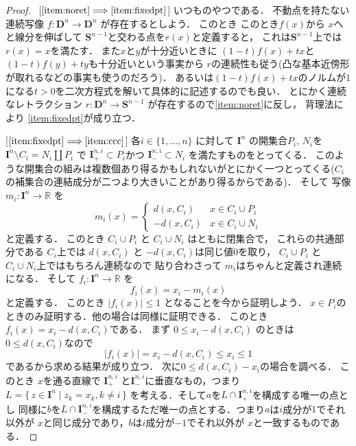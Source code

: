 \documentclass[leqno, a4paper, 12pt]{jsarticle}
\newcommand{\To}{\Longrightarrow}
\newcommand{\rr}{\mathbb{R}}
\newcommand{\mydisc}[1]{\mathbf{D}^{#1}}
\newcommand{\mysphere}[1]{\mathbf{S}^{#1}}
\newcommand{\mycube}[1]{\mathbf{I}^{n}}
\newcommand{\mycubesidep}[2]{\mathbf{I}^{#1, #2}_{+}}
\newcommand{\mycubesidem}[2]{\mathbf{I}^{#1, #2}_{-}}
\begin{document}
\begin{proof}\ 
[$\ref{item:noret}\To \ref{item:fixedpt}$]
いつものやつである．
不動点を持たない連続写像
$f\colon \mydisc{n}\to \mydisc{n}$
が存在するとしよう．
このとき
このとき$f(x)$から
$x$へと線分を伸ばして
$\mysphere{n-1}$と交わる点を$r(x)$と定義すると，
これは$\mysphere{n-1}$上では$r(x)=x$を満たす．
また$x$と$y$が十分近いときに
$(1-t)f(x)+tx$と$(1-t)f(y)+ty$も十分近いという事実から
$r$の連続性も従う(凸な基本近傍形が取れるなどの事実も使うのだろう)．
あるいは$(1-t)f(x)+tx$のノルムが$1$になる$t>0$を二次方程式を解いて具体的に記述するのでも良い．
とにかく連続なレトラクション
$r\colon \mydisc{n}\to \mysphere{n-1}$
が存在するので\ref{item:noret}に反し，
背理法により
\ref{item:fixedpt}が成り立つ．

[$\ref{item:fixedpt}\To \ref{item:ccc}$]
各$i\in \{1, \dots, n\}$
に対して
$\mycube{n}$
の開集合$P_{i}$, 
$N_{i}$を
$\mycube{n}\setminus C_{i}=N_{i}\coprod P_{i}$
で
$\mycubesidep{n}{i}\subset P_{i}$かつ
$\mycubesidem{n}{i}\subset N_{i}$
を満たすものをとってくる．
このような開集合の組みは複数個あり得るかもしれないがとにかく一つとってくる($C_{i}$の補集合の連結成分が二つより大きいことがあり得るからである)．
そして
写像$m_{i}\colon \mycube{n}\to \rr$
を
\[
m_{i}(x)=
\begin{cases}
d(x, C_{i}) & \text{$x \in C_{i}\cup P_{i}$}\\
-d(x, C_{i}) & \text{$x\in C_{i} \cup N_{i}$}
\end{cases}
\]
と定義する．
このとき
$C_{i}\cup P_{i}$
と
$ C_{i}\cup N_{i}$
はともに閉集合で，
これらの共通部分である
$C_{i}$上では
$d(x, C_{i})$
と
$-d(x, C_{i})$は同じ値$0$を取り，
$C_{i}\cup P_{i}$
と
$ C_{i}\cup N_{i}$上ではもちろん連続なので
貼り合わさって
$m_{i}$はちゃんと定義され連続になる．
そして
$f_{i}\colon \mycube{n}\to \rr$
を
\[
f_{i}(x)=x_{i}-m_{i}(x)
\]
と定義する．
このとき
$|f_{i}(x)|\le 1$
となることを今から証明しよう．
$x\in P_{i}$のときのみ証明する．他の場合は同様に証明できる．
このとき$f_{i}(x)=x_{i}-d(x, C_{i})$である．
まず
$0\le x_{i}-d(x, C_{i})$
のときは$0\le d(x, C_{i})$なので
\[
|f_{i}(x)|=x_{i}-d(x, C_{i})\le x_{i}\le 1
\]
であるから求める結果が成り立つ．
次に$0\le d(x, C_{i})-x_{i}$の場合を調べる．
このとき
$x$を通る直線で
$\mycubesidep{n}{i}$
と$\mycubesidem{n}{i}$に垂直なもの，つまり
$L=\{\, z\in \mycube{n}\mid z_{k}=x_{k},   k\neq i\, \}$
を考える．そして$a$を$L\cap\mycubesidep{n}{i}$を構成する唯一の点とし
同様に$b$を$L\cap \mycubesidem{n}{i}$を構成するただ唯一の点とする．つまり$a$は$i$成分が$1$でそれ以外が
$x$と同じ成分であり，$b$は$i$成分が$-1$でそれ以外が
$x$と一致するものである．

\end{proof}
\end{document}
